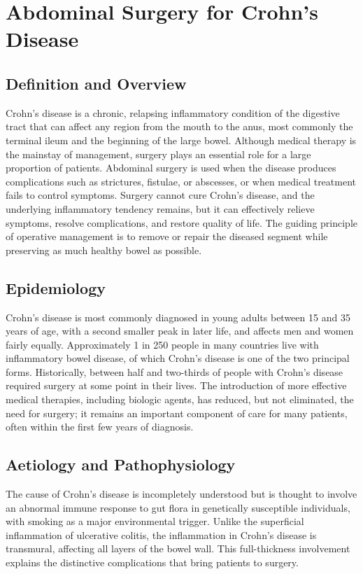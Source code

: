 \chapter{Abdominal Surgery for Crohn's Disease}

\section*{Definition and Overview}
Crohn's disease is a chronic, relapsing inflammatory condition of the digestive tract that can affect any region from the mouth to the anus, most commonly the terminal ileum and the beginning of the large bowel. Although medical therapy is the mainstay of management, surgery plays an essential role for a large proportion of patients. Abdominal surgery is used when the disease produces complications such as strictures, fistulae, or abscesses, or when medical treatment fails to control symptoms. Surgery cannot cure Crohn's disease, and the underlying inflammatory tendency remains, but it can effectively relieve symptoms, resolve complications, and restore quality of life. The guiding principle of operative management is to remove or repair the diseased segment while preserving as much healthy bowel as possible.

\section*{Epidemiology}
Crohn's disease is most commonly diagnosed in young adults between 15 and 35 years of age, with a second smaller peak in later life, and affects men and women fairly equally. Approximately 1 in 250 people in many countries live with inflammatory bowel disease, of which Crohn's disease is one of the two principal forms. Historically, between half and two-thirds of people with Crohn's disease required surgery at some point in their lives. The introduction of more effective medical therapies, including biologic agents, has reduced, but not eliminated, the need for surgery; it remains an important component of care for many patients, often within the first few years of diagnosis.

\section*{Aetiology and Pathophysiology}
The cause of Crohn's disease is incompletely understood but is thought to involve an abnormal immune response to gut flora in genetically susceptible individuals, with smoking as a major environmental trigger. Unlike the superficial inflammation of ulcerative colitis, the inflammation in Crohn's disease is transmural, affecting all layers of the bowel wall. This full-thickness involvement explains the distinctive complications that bring patients to surgery.

